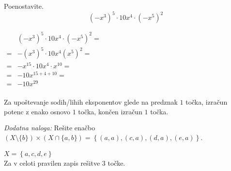 \documentclass[addpoints]{exam}
\begin{document}
\begin{questions}
    \question[3]
    Poenostavite. $$ \left(-x^3\right)^5\cdot 10x^4\cdot\left(-x^5\right)^2$$

    \begin{solution}[7cm]
            $\begin{aligned}
                &\left(-x^3\right)^5\cdot 10x^4\cdot\left(-x^5\right)^2= \\
                    =& -(x^3)^5\cdot 10x^4(x^5)^2=\\
                    =& -x^{15}\cdot 10x^4\cdot x^{10}= \\
                    =& -10x^{15+4+10}= \\
                    =& -10x^{29}
            \end{aligned} $ \\ \\
            Za upoštevanje sodih/lihih eksponentov glede na predznak $1$ točka, izračun potenc z enako osnovo $1$ točka, končen izračun $1$ točka.
    \end{solution}


    
    \bonusquestion[3]
    \textit{Dodatna naloga:} Rešite enačbo $(X\setminus\{b\})\times(X \cap \{a,b\})=\left\{(a,a),(c,a),(d,a),(e,a)\right\}$.

    \begin{solution}
        $X=\left\{a,c,d,e\right\}$ \\
        Za v celoti pravilen zapis rešitve $3$ točke.
    \end{solution}


\end{questions}
\end{document}
